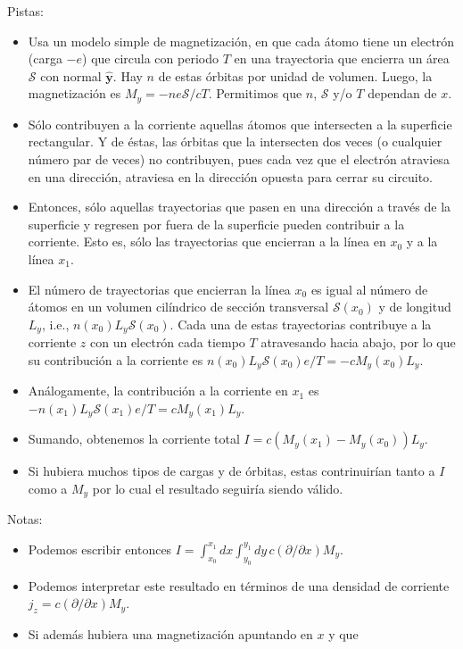 \documentclass{exam}
\begin{document}
\begin{questions}
  Pistas:
  \begin{itemize}
  \item Usa un modelo simple de magnetización, en que cada átomo tiene
    un electrón (carga $-e$) que circula con periodo $T$ en una trayectoria que
    encierra un área $\mathcal S$ con normal $\hat{\bm y}$. Hay $n$ de estas órbitas por unidad
    de volumen. Luego, la magnetización es $M_y=-ne\mathcal
    S/cT$. Permitimos que $n$, $\mathcal S$ y/o $T$ dependan de $x$.
  \item Sólo contribuyen a la corriente aquellas átomos que
    intersecten a la superficie rectangular. Y de éstas, las órbitas
    que la intersecten dos veces (o cualquier número par de veces) no
    contribuyen, pues cada vez que el electrón atraviesa en una
    dirección, atraviesa en la dirección opuesta para cerrar su
    circuito.
  \item Entonces, sólo aquellas trayectorias que pasen en una
    dirección a través de la superficie y regresen por fuera de la
    superficie pueden contribuir a la corriente. Esto es, sólo las
    trayectorias que encierran a la línea en $x_0$ y a la línea
    $x_1$.
  \item El número de trayectorias que encierran la línea $x_0$ es
    igual al número de átomos en un volumen cilíndrico de sección
    transversal $\mathcal S(x_0)$ y de longitud $L_y$, i.e.,
    $n(x_0)L_y\mathcal S(x_0)$. Cada una de estas trayectorias
    contribuye a la corriente $z$ con un electrón cada tiempo $T$
    atravesando hacia abajo, por lo
    que su contribución a la corriente es $n(x_0)L_y\mathcal S(x_0)
    e/T=-cM_y(x_0)L_y$.
  \item Análogamente, la contribución a la corriente en $x_1$ es $-n(x_1)L_y\mathcal S(x_1)
    e/T=cM_y(x_1)L_y$.
  \item Sumando, obtenemos la corriente total
    $I=c(M_y(x_1)-M_y(x_0))L_y$.
  \item Si hubiera muchos tipos de cargas y de órbitas, estas
    contrinuirían tanto a $I$ como a $M_y$ por lo cual el resultado
    seguiría siendo válido.
  \end{itemize}
  Notas:
  \begin{itemize}
  \item Podemos escribir entonces $I=\int_{x_0}^{x_1}
    dx\int_{y_0}^{y_1} dy\, c(\partial/\partial x) M_y$.
  \item Podemos interpretar este resultado en términos de una densidad
    de corriente
    $j_z=c(\partial/\partial x)M_y$.
  \item Si además hubiera una magnetización apuntando en $x$ y que

\end{itemize}
\end{questions}
\end{document}
